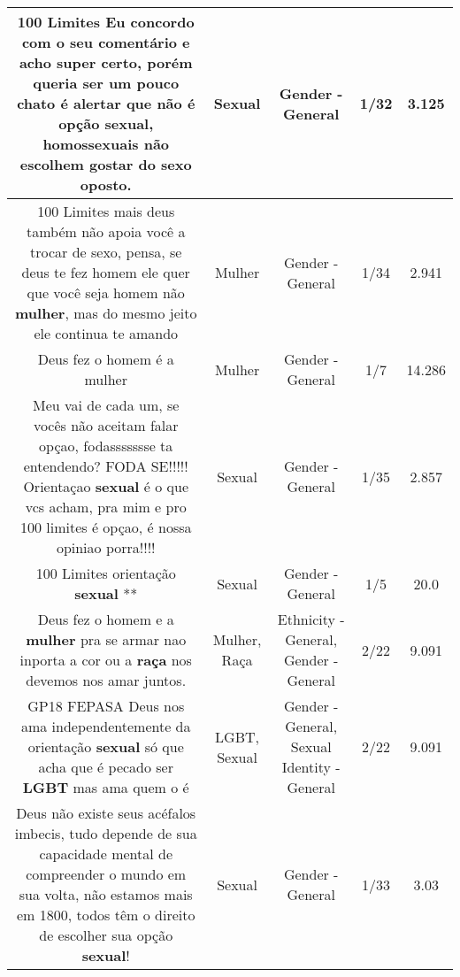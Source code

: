 \documentclass[11pt]{article}
\newlength\mylength
\begin{document}
\begin{center}
\begin{longtable}{|C{.65\mylength}|C{.30\mylength}|C{.12\mylength}|C{.12\mylength}|C{.12\mylength}|}
  \small 100 Limites Eu concordo com o seu comentário e acho super certo, porém queria ser um pouco chato é alertar que não é opção \textbf{sexual}, homossexuais não escolhem gostar do sexo oposto.\normalsize   & Sexual & Gender - General & 1/32 & 3.125 \\  \hline
  \small 100 Limites mais deus também não apoia você a trocar de sexo, pensa, se deus te fez homem ele quer que você seja homem não \textbf{mulher}, mas do mesmo jeito ele continua te amando\normalsize   & Mulher & Gender - General & 1/34 & 2.941 \\  \hline
  \small Deus fez o homem é a mulher\normalsize   & Mulher & Gender - General & 1/7 & 14.286 \\  \hline
  \small Meu vai de cada um, se vocês não aceitam falar opçao, fodassssssse ta entendendo? FODA SE!!!!! Orientaçao \textbf{sexual} é o que vcs acham, pra mim e pro 100 limites é opçao, é nossa opiniao porra!!!!\normalsize   & Sexual & Gender - General & 1/35 & 2.857 \\  \hline
  \small 100 Limites orientação \textbf{sexual} **\normalsize   & Sexual & Gender - General & 1/5 & 20.0 \\  \hline
  \small Deus fez o homem e a \textbf{mulher} pra se armar nao inporta a cor ou a \textbf{raça} nos devemos nos amar juntos.\normalsize   & Mulher, Raça & Ethnicity - General, Gender - General & 2/22 & 9.091 \\  \hline
  \small GP18 FEPASA Deus nos ama independentemente da orientação \textbf{sexual} só que acha que é pecado ser \textbf{LGBT} mas ama quem o é\normalsize   & LGBT, Sexual & Gender - General, Sexual Identity - General & 2/22 & 9.091 \\  \hline
  \small Deus não existe seus acéfalos imbecis, tudo depende de sua capacidade mental de compreender o mundo em sua volta, não estamos mais em 1800, todos têm o direito de escolher sua opção \textbf{sexual}!\normalsize   & Sexual & Gender - General & 1/33 & 3.03 \\  \hline

\end{longtable}
\end{center}
\end{document}
